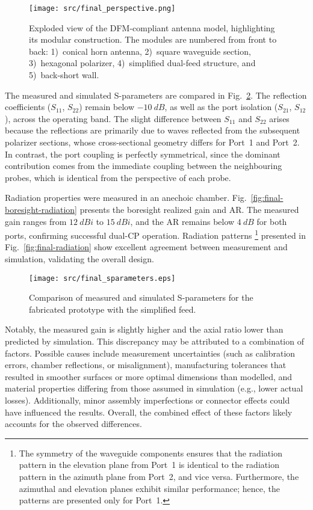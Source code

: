 \documentclass[journal]{IEEEtran}
\begin{document}
\begin{figure}[!b]
\centering
\texttt{[image: src/final\_perspective.png]}
\caption{\label{fig:final-perspective}Exploded view of the DFM-compliant antenna model, highlighting its modular construction. The modules are numbered from front to back: 1)~conical horn antenna, 2)~square waveguide section, 3)~hexagonal polarizer, 4)~simplified dual-feed structure, and 5)~back-short wall.}
\end{figure}

The measured and simulated S-parameters are compared in Fig.~\ref{fig:final-sparameters}. The reflection coefficients ($S_{11}$, $S_{22}$) remain below $\qty{-10}{dB}$, as well as the port isolation ($S_{21}$, $S_{12}$), across the operating band. The slight difference between $S_{11}$ and $S_{22}$ arises because the reflections are primarily due to waves reflected from the subsequent polarizer sections, whose cross-sectional geometry differs for Port~1 and Port~2. In contrast, the port coupling is perfectly symmetrical, since the dominant contribution comes from the immediate coupling between the neighbouring probes, which is identical from the perspective of each probe.

Radiation properties were measured in an anechoic chamber. Fig.~\ref{fig:final-boresight-radiation} presents the boresight realized gain and AR. The measured gain ranges from $\qty{12}{dBi}$ to $\qty{15}{dBi}$, and the AR remains below $\qty{4}{dB}$ for both ports, confirming successful dual-CP operation. Radiation patterns%
    \footnote{The symmetry of the waveguide components ensures that the radiation pattern in the elevation plane from Port~1 is identical to the radiation pattern in the azimuth plane from Port~2, and vice versa. Furthermore, the azimuthal and elevation planes exhibit similar performance; hence, the patterns are presented only for Port~1.}
presented in Fig.~\ref{fig:final-radiation} show excellent agreement between measurement and simulation, validating the overall design.

\begin{figure}[!b]
\centering
\texttt{[image: src/final\_sparameters.eps]}
\caption{\label{fig:final-sparameters}Comparison of measured and simulated S-parameters for the fabricated prototype with the simplified feed.}
\end{figure}

Notably, the measured gain is slightly higher and the axial ratio lower than predicted by simulation. This discrepancy may be attributed to a combination of factors. Possible causes include measurement uncertainties (such as calibration errors, chamber reflections, or misalignment), manufacturing tolerances that resulted in smoother surfaces or more optimal dimensions than modelled, and material properties differing from those assumed in simulation (e.g., lower actual losses). Additionally, minor assembly imperfections or connector effects could have influenced the results. Overall, the combined effect of these factors likely accounts for the observed differences.
\end{document}
